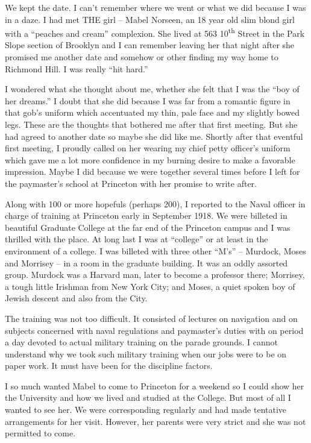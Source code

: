 \documentclass[12pt]{book}              %
\begin{document}
We kept the date. I can't remember where we went or what we did because I was in a daze. I had met THE girl -- Mabel Norseen, an 18 year old slim blond girl with a ``peaches and cream'' complexion. She lived at 563 10\textsuperscript{th} Street in the Park Slope section of Brooklyn and I can remember leaving her that night after she promised me another date and somehow or other finding my way home to Richmond Hill. I was really ``hit hard.''

I wondered what she thought about me, whether she felt that I was the ``boy of her dreams.'' I doubt that she did because I was far from a romantic figure in that gob's uniform which accentuated my thin, pale face and my slightly bowed legs. These are the thoughts that bothered me after that first meeting. But she had agreed to another date so maybe she did like me. Shortly after that eventful first meeting, I proudly called on her wearing my chief petty officer's uniform which gave me a lot more confidence in my burning desire to make a favorable impression. Maybe I did because we were together several times before I left for the paymaster's school at Princeton with her promise to write after. 

Along with 100 or more hopefuls (perhaps 200), I reported to the Naval officer in charge of training at Princeton early in September 1918. We were billeted in beautiful Graduate College at the far end of the Princeton campus and I was thrilled with the place. At long last I was at ``college'' or at least in the environment of a college. I was billeted with three other ``M's'' -- Murdock, Moses and Morrisey -- in a room in the graduate building. It was an oddly assorted group. Murdock was a Harvard man, later to become a professor there; Morrisey, a tough little Irishman from New York City; and Moses, a quiet spoken boy of Jewish descent and also from the City. 

The training was not too difficult. It consisted of lectures on navigation and on subjects concerned with naval regulations and paymaster's duties with on period a day devoted to actual military training on the parade grounds. I cannot understand why we took such military training when our jobs were to be on paper work. It must have been for the discipline factors. 

I so much wanted Mabel to come to Princeton for a weekend so I could show her the University and how we lived and studied at the College. But most of all I wanted to see her. We were corresponding regularly and had made tentative arrangements for her visit. However, her parents were very strict and she was not permitted to come.
\end{document}
